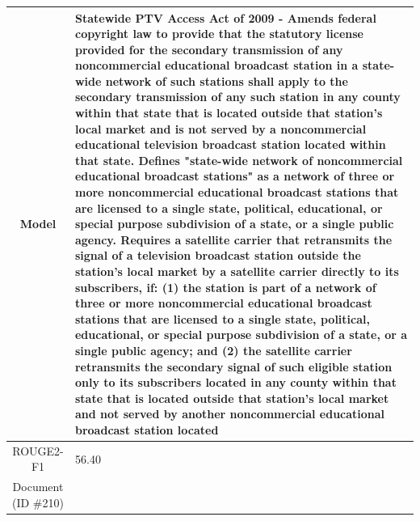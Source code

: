 \begin{table}[bth!]
\begin{tabular}{c|p{}}
\\ \hline
Model & 
Statewide PTV Access Act of 2009 - Amends federal copyright law to provide that the statutory license provided for the secondary transmission of any noncommercial educational broadcast station in a state-wide network of such stations shall apply to the secondary transmission of any such station in any county within that state that is located outside that station's local market and is not served by a noncommercial educational television broadcast station located within that state. Defines "state-wide network of noncommercial educational broadcast stations" as a network of three or more noncommercial educational broadcast stations that are licensed to a single state, political, educational, or special purpose subdivision of a state, or a single public agency. Requires a satellite carrier that retransmits the signal of a television broadcast station outside the station's local market by a satellite carrier directly to its subscribers, if: (1) the station is part of a network of three or more noncommercial educational broadcast stations that are licensed to a single state, political, educational, or special purpose subdivision of a state, or a single public agency; and (2) the satellite carrier retransmits the secondary signal of such eligible station only to its subscribers located in any county within that state that is located outside that station's local market and not served by another noncommercial educational broadcast station located
\\ \hline
ROUGE2-F1 & 
56.40
\\ \hline
\makecell{Document\\(ID \#210)} & 

\end{tabular}
\end{table}
